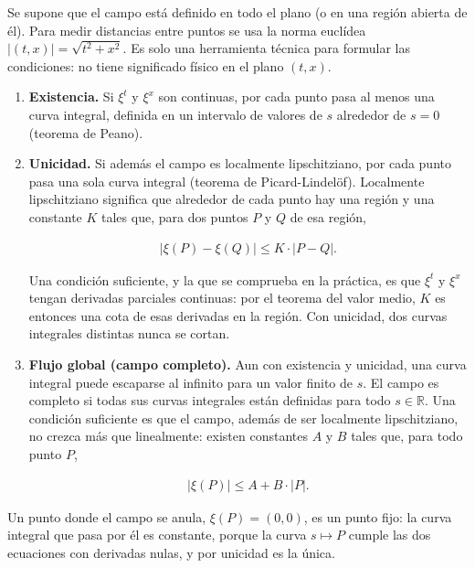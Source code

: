 \documentclass[
  spanish,
]{article}
\begin{document}
Se supone que el campo está definido en todo el plano (o en una región
abierta de él). Para medir distancias entre puntos se usa la norma
euclídea \(|(t, x)| = \sqrt{t^2 + x^2}\). Es solo una herramienta
técnica para formular las condiciones: no tiene significado físico en el
plano \((t, x)\).

\begin{enumerate}
\def\labelenumi{\arabic{enumi}.}
\item
  \textbf{Existencia.} Si \(\xi^t\) y \(\xi^x\) son continuas, por cada
  punto pasa al menos una curva integral, definida en un intervalo de
  valores de \(s\) alrededor de \(s = 0\) (teorema de Peano).
\item
  \textbf{Unicidad.} Si además el campo es localmente lipschitziano, por
  cada punto pasa una sola curva integral (teorema de Picard-Lindelöf).
  Localmente lipschitziano significa que alrededor de cada punto hay una
  región y una constante \(K\) tales que, para dos puntos \(P\) y \(Q\)
  de esa región,

  \[
  \begin{aligned}
  |\xi(P) - \xi(Q)| \le K \cdot |P - Q|.
  \end{aligned}
  \]

  Una condición suficiente, y la que se comprueba en la práctica, es que
  \(\xi^t\) y \(\xi^x\) tengan derivadas parciales continuas: por el
  teorema del valor medio, \(K\) es entonces una cota de esas derivadas
  en la región. Con unicidad, dos curvas integrales distintas nunca se
  cortan.
\item
  \textbf{Flujo global (campo completo).} Aun con existencia y unicidad,
  una curva integral puede escaparse al infinito para un valor finito de
  \(s\). El campo es completo si todas sus curvas integrales están
  definidas para todo \(s \in \mathbb{R}\). Una condición suficiente es
  que el campo, además de ser localmente lipschitziano, no crezca más
  que linealmente: existen constantes \(A\) y \(B\) tales que, para todo
  punto \(P\),

  \[
  \begin{aligned}
  |\xi(P)| \le A + B \cdot |P|.
  \end{aligned}
  \]
\end{enumerate}

Un punto donde el campo se anula, \(\xi(P) = (0, 0)\), es un punto fijo:
la curva integral que pasa por él es constante, porque la curva
\(s \mapsto P\) cumple las dos ecuaciones con derivadas nulas, y por
unicidad es la única.
\end{document}
